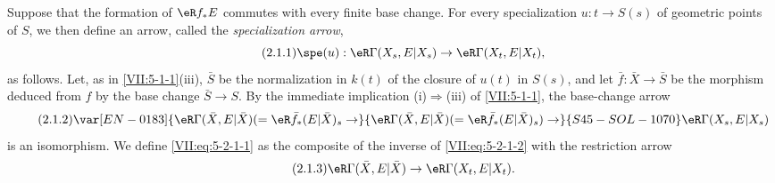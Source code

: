 Suppose that the formation of $\eR f_\ast E$ commutes with every finite base
change. For every specialization $u:t\to S(s)$ of geometric points of $S$,
we then define an arrow, called the \emph{specialization arrow},
\begin{equation*}\tag{2.1.1}\label{VII:eq:5-2-1-1}
  \spe(u):\eR\Gamma(X_s,E|X_s) \to \eR\Gamma(X_t,E|X_t) \text{,}
\end{equation*}
as follows. Let, as in \ref{VII:5-1-1}(iii), $\bar S$ be the normalization in
$k(t)$ of the closure of $u(t)$ in $S(s)$, and let
$\bar f:\bar X\to \bar S$ be the morphism deduced from $f$ by the base change
$\bar S\to S$. By the immediate implication (i)$\Rightarrow$(iii) of
\ref{VII:5-1-1}, the base-change arrow
\begin{equation*}\tag{2.1.2}\label{VII:eq:5-2-1-2}
  \var[EN-0183]{\eR\Gamma(\bar X,E|\bar X) (=\eR\bar f_\ast (E|\bar X)_s \to}{\eR\Gamma(\bar X,E|\bar X) (=\eR\bar f_\ast (E|\bar X)_s) \to}{S45-SOL-1070} \eR\Gamma(X_s,E|X_s) 
\end{equation*}
is an isomorphism. We define \eqref{VII:eq:5-2-1-1} as the composite of the
inverse of \eqref{VII:eq:5-2-1-2} with the restriction arrow
\begin{equation*}\tag{2.1.3}\label{VII:eq:5-2-1-3}
  \eR\Gamma(\bar X,E|\bar X) \to \eR\Gamma(X_t,E|X_t) \text{.}
\end{equation*}






\subsubsection{}\label{VII:5-2-2}

